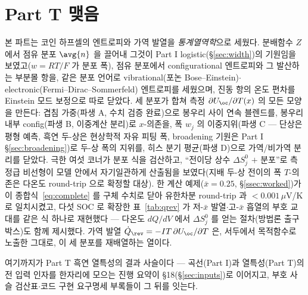 \section*{Part T 맺음}

본 파트는 코인 하프셀의 엔트로피와 가역 발열을 \emph{통계열역학}으로 세웠다. 분배함수 $Z$ 에서 점유 분포
$\avg{n}$ 을 끌어내 그것이 Part I logistic(\S\ref{sec:width})의 기원임을 보였고($w=RT/F$ 가 분포 폭), 점유 분포에서
configurational 엔트로피와 그 발산하는 부분몰 항을, 같은 분포 언어로 vibrational(포논 Bose--Einstein)$\cdot$
electronic(Fermi--Dirac--Sommerfeld) 엔트로피를 세웠으며, 진동 항의 온도 편차를 Einstein 모드 보정으로 따로
닫았다. 세 분포가 합쳐 측정 $\partial U_\oc/\partial T(x)$ 의 모든 모양을 만든다: 겹침 가중(파생 A, 수치 검증
완료)으로 봉우리 사이 연속 블렌드를, 봉우리 내부 config(파생 B, 이중계산 분리)로 $x$-의존을, 폭 $w_j$ 의
이중지위(파생 C --- 단상은 평형 예측, 흑연 두-상은 현상학적 자유 피팅 폭, broadening 기원은 Part I
\S\ref{sec:broadening})로
두-상 폭의 지위를, 히스 분기 평균(파생 D)으로 가역/비가역 분리를 닫았다. 극한 여섯 코너가 분포 식을 검산하고,
``전이당 상수 $\Delta S^0_j$ $+$ 분포''로 측정급 비선형이 모델 안에서 자기일관하게 산출됨을 보였다(지배 두-상
전이의 폭 $T$-의존은 다온도 round-trip 으로 확정할 대상). 한 계산 예제($\bar x{=}0.25$, \S\ref{ssec:worked})가
이 종합식~\eqref{eq:complete} 를 구체 수치로 닫아 유한차분 round-trip 과 $<0.001\,\mu$V/K 로 일치시켰고, 다섯
SOC 로 확장한 표~\ref{tab:qrev} 가 저-$\bar x$ 발열$\cdot$고-$\bar x$ 흡열의 부호 교대를 같은 식 하나로
재현했다 --- 다온도 $dQ/dV$ 에서 $\Delta S^0_j$ 를 얻는 절차(방법론 출구 박스)도 함께 제시했다. 가역 발열
$\dot Q_\rev=-IT\,\partial U_\oc/\partial T$ 은, 서두에서 목적함수로 노출한 그대로, 이 세 분포를 재배열하는
열이다.

여기까지가 Part T 흑연 열특성의 결과 사슬이다 --- 곡선(Part I)과 열특성(Part T)의 전 입력 인자를 한자리에
모으는 진행 요약이 §18(\S\ref{sec:inputs})로 이어지고, 부호 사슬 검산표$\cdot$코드 구현 요구명세 부록들이
그 뒤를 잇는다.

